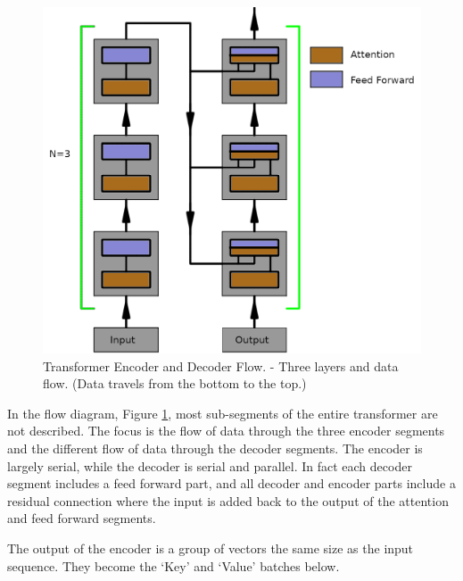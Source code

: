 \begin{figure}[H]
	\begin{center}
		
		
		\includegraphics[scale=1.0]{diagram-flow1}
	\end{center}
	\caption[Transformer Encoder and Decoder Flow]{Transformer Encoder and Decoder Flow. - Three layers and data flow. (Data travels from the bottom to the top.)}
	\label{diagram-flow1}
	
\end{figure}

In the flow diagram, Figure \ref{diagram-flow1}, most sub-segments of the entire transformer are not described. The focus is the flow of data through the three encoder segments and the different flow of data through the decoder segments. The encoder is largely serial, while the decoder is serial and parallel. In fact each decoder segment includes a feed forward part, and all decoder and encoder parts include a residual connection where the input is added back to the output of the attention and feed forward segments.

The output of the encoder is a group of vectors the same size as the input sequence. They become the `Key' and `Value' batches below.


